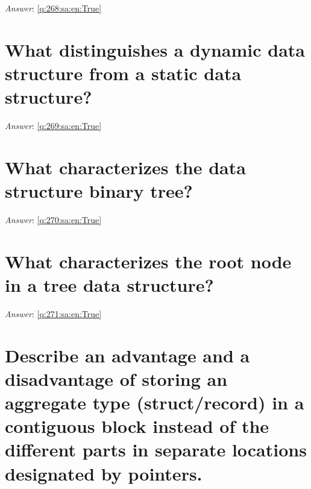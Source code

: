 \documentclass[a4paper,11pt,oneside]{book}
\begin{document}
\begin{sloppypar}
\vspace{1cm}

\textit{Answer}: \autoref{q:268:sa:en:True}



\section{What distinguishes a dynamic data structure from a static data structure?}

\label{q:269:sa:en:False}

\vspace{2cm}

\noindent\makebox[\textwidth]{\hrulefill}

\vspace{1cm}

\textit{Answer}: \autoref{q:269:sa:en:True}



\section{What characterizes the data structure binary tree?}

\label{q:270:sa:en:False}

\vspace{2cm}

\noindent\makebox[\textwidth]{\hrulefill}

\vspace{1cm}

\textit{Answer}: \autoref{q:270:sa:en:True}



\section{What characterizes the root node in a tree data structure?}

\label{q:271:sa:en:False}

\vspace{2cm}

\noindent\makebox[\textwidth]{\hrulefill}

\vspace{1cm}

\textit{Answer}: \autoref{q:271:sa:en:True}



\section{Describe an advantage and a disadvantage of storing an aggregate type (struct/record) in a contiguous block instead of the different parts in separate locations designated by pointers.}


\end{sloppypar}
\end{document}
